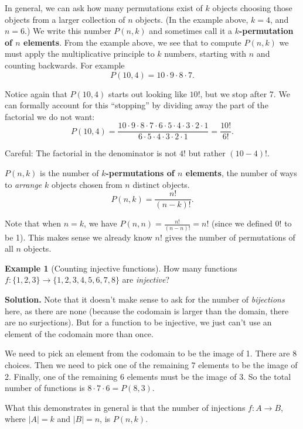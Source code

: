 \documentclass[10pt,]{book}
\newcommand{\terminology}[1]{\textbf{#1}}
\theoremstyle{plain}
\theoremstyle{definition}
\theoremstyle{definition}
\newtheorem{example}[theorem]{Example}
\theoremstyle{definition}
\theoremstyle{definition}
\numberwithin{equation}{chapter}
\newcommand{\card}[1]{\left| #1 \right|}
\begin{document}
\hypertarget{p-904}{}%
In general, we can ask how many permutations exist of \(k\) objects choosing those objects from a larger collection of \(n\) objects. (In the example above, \(k = 4\), and \(n = 6\).) We write this number \(P(n,k)\) and sometimes call it a \terminology{\(k\)-permutation of \(n\) elements}. From the example above, we see that to compute \(P(n,k)\) we must apply the multiplicative principle to \(k\) numbers, starting with \(n\) and counting backwards. For example%
\begin{equation*}
P(10, 4) = 10\cdot 9 \cdot 8 \cdot 7.
\end{equation*}
%
\par
\hypertarget{p-905}{}%
Notice again that \(P(10,4)\) starts out looking like \(10!\), but we stop after 7. We can formally account for this ``stopping'' by dividing away the part of the factorial we do not want:%
\begin{equation*}
P(10,4) = \frac{10\cdot 9 \cdot 8 \cdot 7 \cdot 6 \cdot 5 \cdot 4 \cdot 3 \cdot 2 \cdot 1}{6 \cdot 5 \cdot 4 \cdot 3 \cdot 2 \cdot 1} = \frac{10!}{6!}.
\end{equation*}
%
\par
\hypertarget{p-906}{}%
Careful: The factorial in the denominator is not \(4!\) but rather \((10-4)!\).%
\begin{assemblage}\label{assemblage-22}
\hypertarget{p-907}{}%
 \(P(n,k)\) is the number of \terminology{\(k\)-permutations of \(n\) elements}, the number of ways to \emph{arrange} \(k\) objects chosen from \(n\) distinct objects.%
\begin{equation*}
P(n,k) = \frac{n!}{(n-k)!}.
\end{equation*}
%
\end{assemblage}
\hypertarget{p-908}{}%
Note that when \(n = k\), we have \(P(n,n) = \frac{n!}{(n-n)!} = n!\) (since we defined \(0!\) to be 1). This makes sense \textemdash{}we already know \(n!\) gives the number of permutations of all \(n\) objects.%
\begin{example}[Counting injective functions]\label{example-counting-functions-injective}
\hypertarget{p-909}{}%
How many functions \(f:\{1,2,3\} \to \{1,2,3,4,5,6,7,8\}\) are \emph{injective}?%
\par\smallskip%
\noindent\textbf{Solution.}\hypertarget{solution-99}{}\quad%
\hypertarget{p-910}{}%
Note that it doesn't make sense to ask for the number of \emph{bijections} here, as there are none (because the codomain is larger than the domain, there are no surjections). But for a function to be injective, we just can't use an element of the codomain more than once.%
\par
\hypertarget{p-911}{}%
We need to pick an element from the codomain to be the image of 1. There are 8 choices. Then we need to pick one of the remaining 7 elements to be the image of 2. Finally, one of the remaining 6 elements must be the image of 3. So the total number of functions is \(8\cdot 7 \cdot 6 = P(8,3)\).%
\par
\hypertarget{p-912}{}%
What this demonstrates in general is that the number of injections \(f:A \to B\), where \(\card{A} = k\) and \(\card{B} = n\), is \(P(n,k)\).%
\end{example}
\end{document}
